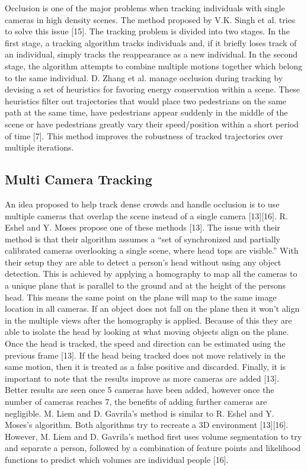 \documentclass[conference]{IEEEtran}
\begin{document}
Occlusion is one of the major problems when tracking individuals with single cameras in high density scenes. The method proposed by V.K. Singh et al. tries to solve this issue [15]. The tracking problem is divided into two stages. In the first stage, a tracking algorithm tracks individuals and, if it briefly loses track of an individual, simply tracks the reappearance as a new individual. In the second stage, the algorithm attempts to combine multiple motions together which belong to the same individual.
D. Zhang et al. manage occlusion during tracking by devising a set of heuristics for favoring energy conservation within a scene. These heuristics filter out trajectories that would place two pedestrians on the same path at the same time, have pedestrians appear suddenly in the middle of the scene or have pedestrians greatly vary their speed/position within a short period of time [7]. This method improves the robustness of tracked trajectories over multiple iterations.

\subsection{Multi Camera Tracking}

An idea proposed to help track dense crowds and handle occlusion is to use multiple cameras that overlap the scene instead of a single camera [13][16]. R. Eshel and Y. Moses propose one of these methods [13]. The issue with their method is that their algorithm assumes a “set of synchronized and partially calibrated cameras overlooking a single scene, where head tops are visible.” With their setup they are able to detect a person’s head without using any object detection. This is achieved by applying a homography to map all the cameras to a unique plane that is parallel to the ground and at the height of the persons head. This means the same point on the plane will map to the same image location in all cameras. If an object does not fall on the plane then it won’t align in the multiple views after the homography is applied. Because of this they are able to isolate the head by looking at what moving objects align on the plane.
Once the head is tracked, the speed and direction can be estimated using the previous frame [13]. If the head being tracked does not move relatively in the same motion, then it is treated as a false positive and discarded. 
Finally, it is important to note that the results improve as more cameras are added [13]. Better results are seen once 5 cameras have been added, however once the number of cameras reaches 7, the benefits of adding further cameras are negligible.
M. Liem and D. Gavrila’s method is similar to R. Eshel and Y. Moses’s algorithm. Both algorithms try to recreate a 3D environment [13][16]. However, M. Liem and D. Gavrila’s method first uses volume segmentation to try and separate a person, followed by a combination of feature points and likelihood functions to predict which volumes are individual people [16].
\end{document}
